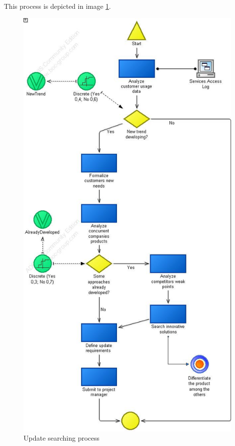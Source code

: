 This process is depicted in image \ref{2img:search_upd}.

\begin{figure}[!ht]
\begin{centering}
\includegraphics[scale=0.50]{assign2/adonis/imgs/search_upd.jpg}
\caption{Update searching process}
\label{2img:search_upd}
\end{centering}
\end{figure}

